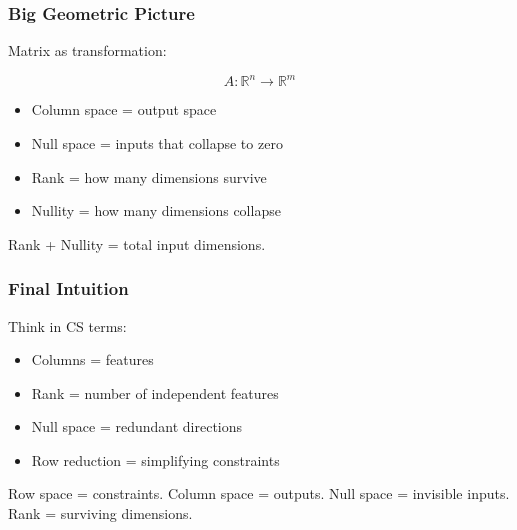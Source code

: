 \documentclass{beamer}
\begin{document}
\begin{frame}
\frametitle{Big Geometric Picture}

Matrix as transformation:

\[
A : \mathbb{R}^n \to \mathbb{R}^m
\]

\begin{itemize}
    \item Column space = output space
    \item Null space = inputs that collapse to zero
    \item Rank = how many dimensions survive
    \item Nullity = how many dimensions collapse
\end{itemize}

Rank + Nullity = total input dimensions.
\end{frame}

\begin{frame}
\frametitle{Final Intuition}

Think in CS terms:

\begin{itemize}
    \item Columns = features
    \item Rank = number of independent features
    \item Null space = redundant directions
    \item Row reduction = simplifying constraints
\end{itemize}

Row space = constraints.
Column space = outputs.
Null space = invisible inputs.
Rank = surviving dimensions.
\end{frame}

\end{document}
